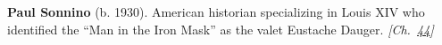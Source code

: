 \textbf{Paul Sonnino} (b. 1930). American historian specializing in Louis XIV who identified the ``Man in the Iron Mask'' as the valet Eustache Dauger. \emph{[Ch.~\hyperref[ch:ironmask]{44}]}

